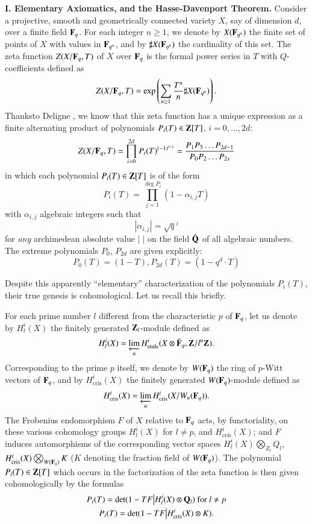 \medskip
\noindent
{\bf I. Elementary Axiomatics, and the Hasse-Davenport Theorem.}
Consider a projective, smooth and geometrically connected variety $X$, say of dimension $d$, over a finite field $\mathbf{F}_{q}$. For each integer $n\geq 1$, we denote by $X(\mathbf{F}_{q^{n}})$ the finite set of points of $X$ with values in $\mathbf{F}_{q^{n}}$, and by $\sharp X(\mathbf{F}_{q^{n}})$ the cardinality of this set. The zeta function $Z(X/\mathbf{F}_{q},T)$ of $X$ over $\mathbf{F}_{q}$ is the formal power series in $T$ with $Q$-coefficients defined as
$$
Z(X/\mathbf{F}_{q},T)=\exp \left(\sum\limits_{n\geq 1}\frac{T^{n}}{n}\sharp X(\mathbf{F}_{q^{n}})\right).
$$
Thanks\pageoriginale to Deligne \cite{art6-key6}, we know that this zeta function has a unique expression as a finite alternating product of polynomials $P_i (T) \in \mathbf{Z} [T]$, $i = 0, \ldots, 2d$:
$$
Z (X/ \mathbf{F}_q, T) = \prod\limits^{2d}_{i=0} P_i (T)^{(-1)^{i+1}} = \frac{P_1 P_3 \ldots P_{2d-1}}{P_0 P_2 \ldots P_{2s}}
$$
in which each polynomial $P_i (T) \in\mathbf{Z}[T]$ is of the form 
$$
P_i (T) = \prod\limits^{\deg P_i}_{j=1} (1 -\alpha_{i,j} T)
$$
with $\alpha_{i,j}$ algebraic integers such that 
$$
|\alpha_{i,j}| = \sqrt{q}^i
$$
for \textit{any} archimedean absolute value $|\;|$ on the field $\bar{\mathbf{Q}}$ of all algebraic numbers. The extreme polynomials $P_0$, $P_{2d}$ are given explicitly:
$$
P_0 (T) = (1-T) , P_{2d} (T) = (1 - q^d \cdot T)
$$

Despite this apparently ``elementary'' characterization of the polynomials $P_i (T)$, their true genesis is cohomological. Let us recall this briefly.

For each prime number $l$ different from the characteristic $p$ of $\mathbf{F}_q$, let us denote by $H^i_l(X)$ the finitely generated $\mathbf{Z}_l$-module defined as 
$$
H^i_l (X) =  \varprojlim_n H^i_{\text{etale}} (X \otimes \bar{\mathbf{F}}_q, \mathbf{Z} / l^n \mathbf{Z} ).
$$
Corresponding to the prime $p$ itself, we denote by $W(\mathbf{F}_q)$ the ring of $p$-Witt vectors of $\mathbf{F}_q$, and by $H^i_{\text{cris}} (X)$ the finitely generated $W(\mathbf{F}_q)$-module defined as 
$$
H^i_{\text{cris}} (X) = \varprojlim_n H^i_{\text{cris}} (X / W_n (\mathbf{F}_q)).
$$
The Frobenius endomorphism $F$ of $X$ relative to $\mathbf{F}_q$ acts, by functoriality, on these various cohomology groups $H^i_l(X)$ for $l\neq p$, and $H^i_{\text{cris}} (X)$; and $F$ induces automorphisms of the corresponding vector spaces $H^i_l(X) \bigotimes_{Z_l} Q_l$, $H^i_{\text{cris}} (X) \bigotimes_{W(\mathbf{F}_q)} K$ ($K$ denoting the fraction field of $W(\mathbf{F}_q)$). The polynomial $P_i (T) \in \mathbf{Z} [T]$ which occurs in the factorization of the zeta function is then given cohomologically by the formulas 
\begin{gather*}
P_i(T) = \det (1 - T F \big| H^i_l(X) \otimes \mathbf{Q}_l) \text{ for } l \neq p\\
P_i (T) = \det (1 - T F \big| H^i_{\text{cris}} (X) \otimes K).
\end{gather*}\pageoriginale 

